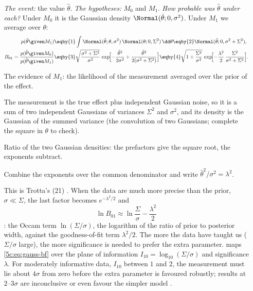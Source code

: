 \emph{The event:} the value $\hat\theta$. \emph{The hypotheses:} $M_0$ and $M_1$.
\emph{How probable was $\hat\theta$ under each?} Under $M_0$ it is the Gaussian density
$\Normal(\hat\theta;0,\sigma^2)$. Under $M_1$ we average over $\theta$:
\begin{align}
  p(\hat\theta\given M_1)
  &\eqby{1}\int\Normal(\hat\theta;\theta,\sigma^2)\,\Normal(\theta;0,\Sigma^2)\,\dd\theta
   \eqby{2}\Normal(\hat\theta;0,\sigma^2+\Sigma^2), \nonumber\\
  B_{01}=\frac{p(\hat\theta\given M_0)}{p(\hat\theta\given M_1)}
  &\eqby{3}\sqrt{\frac{\sigma^2+\Sigma^2}{\sigma^2}}\,
     \exp\!\Bigl[-\frac{\hat\theta^2}{2\sigma^2}+\frac{\hat\theta^2}{2(\sigma^2+\Sigma^2)}\Bigr]
   \eqby{4}\sqrt{1+\frac{\Sigma^2}{\sigma^2}}\,
     \exp\!\Bigl[-\frac{\lambda^2}{2}\,\frac{\Sigma^2}{\sigma^2+\Sigma^2}\Bigr] .
  \label{5c:eq:gauss-bf}
\end{align}
\begin{explain}
  \item The evidence of $M_1$: the likelihood of the measurement averaged over the
        prior of the effect.
  \item The measurement is the true effect plus independent Gaussian noise, so it is
        a sum of two independent Gaussians of variances $\Sigma^2$ and $\sigma^2$, and
        its density is the Gaussian of the summed variance (the convolution of two
        Gaussians; complete the square in $\theta$ to check).
  \item Ratio of the two Gaussian densities: the prefactors give the square root, the
        exponents subtract.
  \item Combine the exponents over the common denominator and write
        $\hat\theta^2/\sigma^2=\lambda^2$.
\end{explain}
This is Trotta's (21) \cite[p.~13]{Trotta2008}. When the data are much more precise than
the prior, $\sigma\ll\Sigma$, the last factor becomes $e^{-\lambda^2/2}$ and
\begin{equation}
  \ln B_{01}\approx\ln\frac{\Sigma}{\sigma}-\frac{\lambda^2}{2}
  \label{5c:eq:rough-guide}
\end{equation}
\cite[eq.~(26)]{Trotta2008}: the Occam term $\ln(\Sigma/\sigma)$, the logarithm of the
ratio of prior to posterior width, against the goodness-of-fit term $\lambda^2/2$. The
more the data have taught us ($\Sigma/\sigma$ large), the more significance is needed to
prefer the extra parameter.  maps \eqref{5c:eq:gauss-bf} over the
plane of information $I_{10}=\log_{10}(\Sigma/\sigma)$ and significance $\lambda$. For
moderately informative data, $I_{10}$ between $1$ and $2$, the measurement must lie about
$4\sigma$ from zero before the extra parameter is favoured robustly; results at
$2$--$3\sigma$ are inconclusive or even favour the simpler model \cite[\S4.4]{Trotta2008}.

